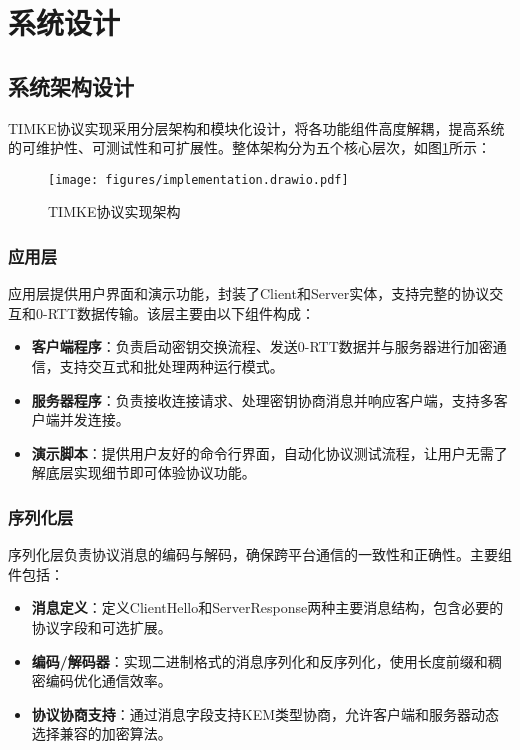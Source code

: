 \section{系统设计}

\subsection{系统架构设计}

TIMKE协议实现采用分层架构和模块化设计，将各功能组件高度解耦，提高系统的可维护性、可测试性和可扩展性。整体架构分为五个核心层次，如图\ref{fig:system-architecture}所示：

\begin{figure}[H]
  \centering
  \texttt{[image: figures/implementation.drawio.pdf]}
  \caption{TIMKE协议实现架构}
  \label{fig:system-architecture}
\end{figure}

\subsubsection{应用层}
应用层提供用户界面和演示功能，封装了Client和Server实体，支持完整的协议交互和0-RTT数据传输。该层主要由以下组件构成：

\begin{itemize}
    \item \textbf{客户端程序}：负责启动密钥交换流程、发送0-RTT数据并与服务器进行加密通信，支持交互式和批处理两种运行模式。
    
    \item \textbf{服务器程序}：负责接收连接请求、处理密钥协商消息并响应客户端，支持多客户端并发连接。
    
    \item \textbf{演示脚本}：提供用户友好的命令行界面，自动化协议测试流程，让用户无需了解底层实现细节即可体验协议功能。
\end{itemize}

\subsubsection{序列化层}
序列化层负责协议消息的编码与解码，确保跨平台通信的一致性和正确性。主要组件包括：

\begin{itemize}
    \item \textbf{消息定义}：定义ClientHello和ServerResponse两种主要消息结构，包含必要的协议字段和可选扩展。
    
    \item \textbf{编码/解码器}：实现二进制格式的消息序列化和反序列化，使用长度前缀和稠密编码优化通信效率。
    
    \item \textbf{协议协商支持}：通过消息字段支持KEM类型协商，允许客户端和服务器动态选择兼容的加密算法。
\end{itemize}

